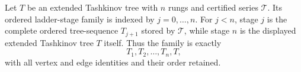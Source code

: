 \begin{definition}
Let \(T\) be an extended Tashkinov tree with \(n\) rungs and certified
series \(\mathcal T\).  Its ordered ladder-stage family is indexed by
\(j=0,\ldots,n\).  For \(j<n\), stage \(j\) is the complete ordered
tree-sequence \(T_{j+1}\) stored by \(\mathcal T\), while stage \(n\) is
the displayed extended Tashkinov tree \(T\) itself.  Thus the family is
exactly
\[
                     T_1,T_2,\ldots,T_n,T,
\]
with all vertex and edge identities and their order retained.
\end{definition}
